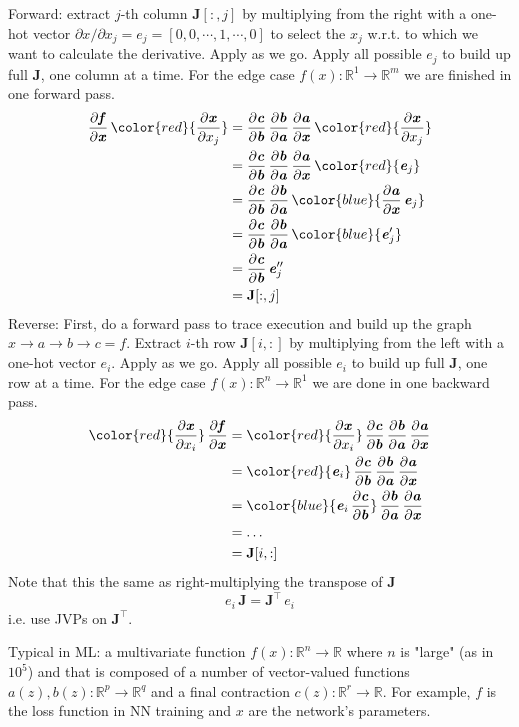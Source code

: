 \documentclass[paper=a4,11pt,headsepline]{scrartcl}
\newcommand{\ve}[1]{\ensuremath{\bm{\mathit{#1}}}}
\newcommand{\ma}[1]{\ensuremath{\bm{\mathbf{#1}}}}
\newcommand{\ra}{\rightarrow}
\newcommand{\pd}[2]{\dfrac{\partial #1}{\partial #2}}
\newcommand{\red}[1]{{\color{red}{#1}}}
\newcommand{\blue}[1]{{\color{blue}{#1}}}
\begin{document}
Forward: extract $j$-th column $\ma J[:,j]$ by multiplying from the right with
a one-hot vector $\partial\ve x/\partial x_j = \ve e_j = [0,0,\cdots,1,\cdots,
0]$ to select the $x_j$ w.r.t. to which we want to calculate the derivative.
Apply \blue{Jacobian vector products (JVPs)} as we go.
Apply all possible $\ve e_j$ to build up full $\ma J$, one column at a time.
For the edge case $\ve f(x): \mathbb R^1 \ra \mathbb R^m$ we are finished in one
forward pass.
    \begin{align*}
    \pd{\ve f}{\ve x}\,\red{\pd{\ve x}{x_j}}
        &= \pd{\ve c}{\ve b}\,\pd{\ve b}{\ve a}\,\pd{\ve a}{\ve x}\,\red{\pd{\ve x}{x_j}}\\
        &= \pd{\ve c}{\ve b}\,\pd{\ve b}{\ve a}\,\pd{\ve a}{\ve x}\,\red{\ve e_j}\\
        &= \pd{\ve c}{\ve b}\,\pd{\ve b}{\ve a}\,\blue{\pd{\ve a}{\ve x}\,\ve e_j} \\
        &= \pd{\ve c}{\ve b}\,\pd{\ve b}{\ve a}\,\blue{\ve e_j'} \\
        &= \pd{\ve c}{\ve b}\,\ve e_j'' \\
        &= \ma J[:,j] \\
    \end{align*}
Reverse: First, do a forward pass to trace execution and build up the graph
$\ve x\ra \ve a\ra \ve b\ra \ve c = \ve f$.
Extract $i$-th row $\ma J[i,:]$ by multiplying from the left with a
one-hot vector $\ve e_i$. Apply \blue{vector Jacobian products (VJPs)} as we go.
Apply all possible $\ve e_i$ to build up full $\ma J$, one row at a time.
For the edge case $f(\ve x): \mathbb R^n \ra \mathbb R^1$ we
are done in one backward pass.
    \begin{align*}
    \red{\pd{\ve x}{x_i}}\,\pd{\ve f}{\ve x}
        &= \red{\pd{\ve x}{x_i}}\,\pd{\ve c}{\ve b}\,\pd{\ve b}{\ve a}\,\pd{\ve a}{\ve x}\\
        &= \red{\ve e_i}\,\pd{\ve c}{\ve b}\,\pd{\ve b}{\ve a}\,\pd{\ve a}{\ve x}\\
        &= \blue{\ve e_i\,\pd{\ve c}{\ve b}}\,\pd{\ve b}{\ve a}\,\pd{\ve a}{\ve x}\\
        &= \ldots\\
        &= \ma J[i,:]
    \end{align*}
Note that this the same as right-multiplying the transpose of $\ma J$
$$\ve e_i\,\ma J = \ma J^\top\,\ve e_i$$
i.e. use JVPs on $\ma J^\top$.

Typical in ML: a multivariate function $f(\ve x): \mathbb R^n\ra \mathbb R$
where $n$ is "large" (as in $10^5$) and
that is composed of a number of vector-valued functions $\ve a(\ve z), \ve
b(\ve z): \mathbb R^p\ra \mathbb R^q$ and a final contraction $c(\ve z): \mathbb R^r\ra \mathbb R$.
For example, $f$ is the loss function in NN training and $\ve x$ are the
network's parameters.
\end{document}
